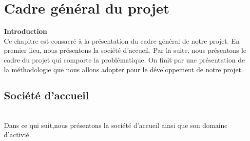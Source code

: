 

\chapter{Cadre général du projet}

\newpage

\textbf{\huge Introduction} \\[1cm]




\textsf{\selectfont{}
    Ce chapitre est consacré à la présentation du cadre général de notre projet. En premier lieu, nous présentons la société d’accueil. Par la suite, nous présentons le cadre du projet qui comporte la problématique. On finit par une présentation de la méthodologie que nous allons adopter pour le développement de notre projet.}\\[1cm]




\section{\LARGE Société d’accueil }
\texttt{}\\[0.1cm]
\textsf{\selectfont{}Dans ce qui suit,nous présentons la société d'accueil ainsi que son domaine d'activié.}
\texttt{}\\[0.1cm] 
